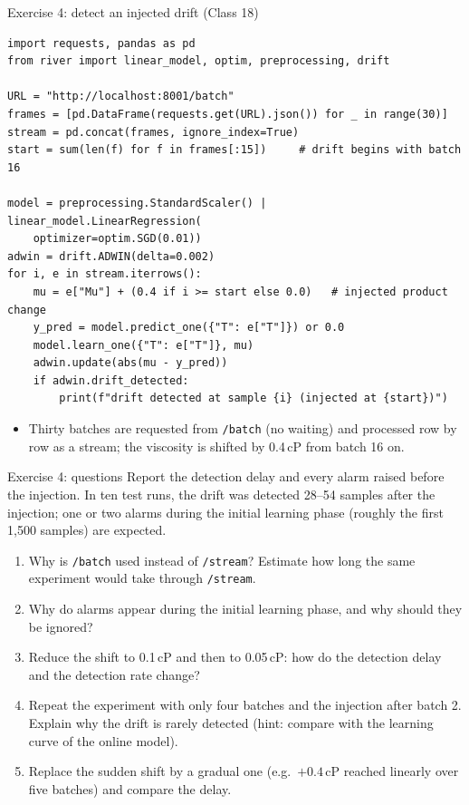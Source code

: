 \begin{frame}[fragile]{Exercise 4: detect an injected drift (Class 18)}
\begin{lstlisting}[style=coursepython, basicstyle=\ttfamily\scriptsize]
import requests, pandas as pd
from river import linear_model, optim, preprocessing, drift

URL = "http://localhost:8001/batch"
frames = [pd.DataFrame(requests.get(URL).json()) for _ in range(30)]
stream = pd.concat(frames, ignore_index=True)
start = sum(len(f) for f in frames[:15])     # drift begins with batch 16

model = preprocessing.StandardScaler() | linear_model.LinearRegression(
    optimizer=optim.SGD(0.01))
adwin = drift.ADWIN(delta=0.002)
for i, e in stream.iterrows():
    mu = e["Mu"] + (0.4 if i >= start else 0.0)   # injected product change
    y_pred = model.predict_one({"T": e["T"]}) or 0.0
    model.learn_one({"T": e["T"]}, mu)
    adwin.update(abs(mu - y_pred))
    if adwin.drift_detected:
        print(f"drift detected at sample {i} (injected at {start})")
\end{lstlisting}
\begin{itemize}\footnotesize
\item Thirty batches are requested from \texttt{/batch} (no waiting) and processed row by row as a stream; the viscosity is shifted by 0.4\,cP from batch 16 on.
\end{itemize}
\coursefooter
\end{frame}

\begin{frame}{Exercise 4: questions}
\begingroup\small
Report the detection delay and every alarm raised before the injection. In ten test runs, the drift was detected 28--54 samples after the injection; one or two alarms during the initial learning phase (roughly the first 1{,}500 samples) are expected.
\par\endgroup
\vspace{0.3em}
\begin{enumerate}\small
\item Why is \texttt{/batch} used instead of \texttt{/stream}? Estimate how long the same experiment would take through \texttt{/stream}.
\item Why do alarms appear during the initial learning phase, and why should they be ignored?
\item Reduce the shift to 0.1\,cP and then to 0.05\,cP: how do the detection delay and the detection rate change?
\item Repeat the experiment with only four batches and the injection after batch 2. Explain why the drift is rarely detected (hint: compare with the learning curve of the online model).
\item Replace the sudden shift by a gradual one (e.g.\ $+0.4\,$cP reached linearly over five batches) and compare the delay.
\end{enumerate}
\coursefooter
\end{frame}

